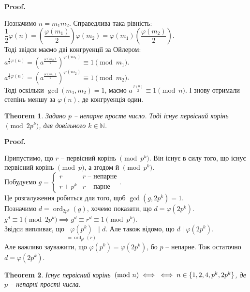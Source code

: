 \documentclass[a4paper, 14pt]{extarticle}
\makeatletter
\theoremstyle{theoremdd}
\newtheorem{theorem}{Theorem}[subsection]
\theoremstyle{theoremdd}
\theoremstyle{theoremdd}
\theoremstyle{theoremdd}
\theoremstyle{theoremdd}
\theoremstyle{theoremdd}
\theoremstyle{theoremdd}
\theoremstyle{theoremdd}
\def\qed{$\blacksquare$}
\renewenvironment{proof}[1][Proof.\\]{\par
\pushQED{\hfill \qed}%
\normalfont \topsep6\p@\@plus6\p@\relax
\trivlist
\item\relax
{\bfseries
#1\@addpunct{.}}\hspace\labelsep\ignorespaces
}{%
\popQED\endtrivlist\@endpefalse
}
\DeclareMathOperator{\ord}{ord}
\makeatother
\begin{document}
\begin{proof}
Позначимо $n = m_1m_2$. Справедлива така рівність:\\
$\dfrac{1}{2} \varphi(n) = \left(\dfrac{\varphi(m_1)}{2} \right) \varphi(m_2) = \varphi(m_1) \left( \dfrac{\varphi(m_2)}{2} \right)$.\\
Тоді звідси маємо дві конгруенції за Ойлером:\\
$a^{\frac{1}{2} \varphi(n)} = \left(a^{\frac{\varphi(m_2)}{2}} \right)^{\varphi(m_1)} \equiv 1 \pmod {m_1}$.\\
$a^{\frac{1}{2} \varphi(n)} = \left(a^{\frac{\varphi(m_1)}{2}} \right)^{\varphi(m_2)} \equiv 1 \pmod {m_2}$.\\
Тоді оскільки $\gcd(m_1,m_2) = 1$, маємо $a^{\frac{\varphi(n)}{2}} \equiv 1 \pmod {n}$. І знову отримали степінь меншу за $\varphi(n)$, де конгруенція один.
\end{proof}

\begin{theorem}
Задано $p$ -- непарне просте число. Тоді існує первісний корінь $\!\! \pmod {2p^k}$, для довільного $k \in \mathbb{N}$.
\end{theorem}

\begin{proof}
Припустимо, що $r$ -- первісний корінь $\pmod {p^k}$. Він існує в силу того, що існує первісний корінь $\pmod p$, а згодом й $\pmod {p^k}$.\\
Побудуємо $g = \begin{cases} r & r \text{ -- непарне} \\ r+p^k & r \text{ -- парне} \end{cases}$. \\
Це розгалуження робиться для того, щоб $\gcd(g,2p^k) = 1$.\\
Позначимо $d = \ord_{2p^k}(g)$, хочемо показати, що $d = \varphi(2p^k)$.\\
$g^d \equiv 1 \pmod {2p^k} \implies g^d \equiv r^d \equiv 1 \pmod {p^k}$.\\
Звідси випливає, що $\underset{=\ord_{p^k}(r)}{\varphi(p^k)} \mid d$. Але також відомо, що $d \mid \varphi(2p^k)$.\\
Але важливо зауважити, що $\varphi(p^k) = \varphi(2p^k)$, бо $p$ -- непарне. Тож остаточно $d = \varphi(2p^k)$.
\end{proof}

\begin{theorem}
Існує первісний корінь $\!\! \pmod n \iff \\ \iff n \in \{1,2,4,p^k,2p^k\}$, де $p$ -- непарні прості числа.
\end{theorem}
\end{document}
